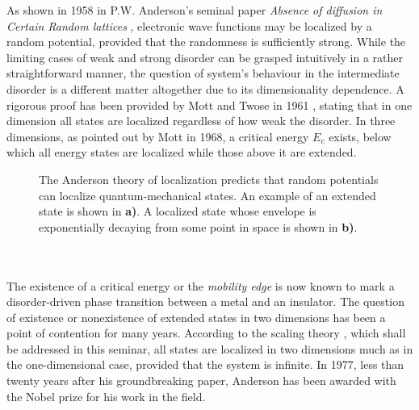 \documentclass[10pt,a4paper]{article}
\begin{document}
\begin{minipage}[t]{0.58\textwidth}
\hfill \break
\noindent As shown in 1958 in P.W. Anderson's seminal paper \emph{Absence of diffusion in Certain Random lattices} \cite{Anderson}, electronic wave functions may be localized by a random potential, provided that the randomness is sufficiently strong.  While the limiting cases of weak and strong disorder can be grasped intuitively in a rather straightforward manner, the question of system's behaviour in the intermediate disorder is a different matter altogether due to its dimensionality dependence. A rigorous proof has been provided by Mott and Twose in 1961 \cite{Mott_Twose}, stating that in one dimension all states are 
localized regardless of how weak the disorder. In three dimensions, as pointed out by Mott in 1968, a critical energy $E_c$ exists, below which all energy states are localized while those above it are extended. 
\end{minipage}\hfill
\begin{minipage}[t]{0.4\textwidth}
\begin{figure}[H]
\caption{ The Anderson theory of localization predicts that random potentials can localize quantum-mechanical states. An example of an extended state is shown in \textbf{a)}. A localized state whose envelope is exponentially decaying from some point in space is shown in \textbf{b)}.}
\label{fig:loc_ext_states} 
\end{figure}
\end{minipage}\\\\
\noindent 
 The existence of a critical energy or  the \emph{mobility edge} \cite{Mott_transitions} is now known to mark a disorder-driven phase transition between a metal and an insulator. The question of existence or nonexistence of extended states in two dimensions has been a point of contention for many years. According to the scaling theory \cite{scaling}, which shall be addressed in this seminar, all states are localized in two dimensions much as in the one-dimensional case, provided that the system is infinite. In 1977, less than twenty years after his groundbreaking paper, Anderson has been awarded with the Nobel prize for his work in the field.   \\\\
\end{document}
